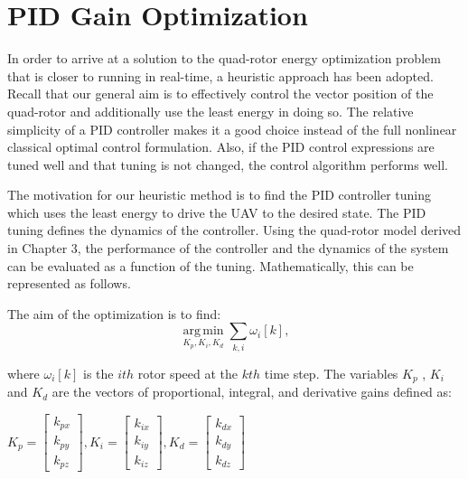 
\chapter{PID Gain Optimization} %

\label{Chapter7} %



In order to arrive at a solution to the quad-rotor energy optimization problem that is closer to running in real-time, a heuristic approach has been adopted. Recall that our general aim is to effectively control the vector position of the quad-rotor and additionally use the least energy in doing so. The relative simplicity of a PID controller makes it a good choice instead of the full nonlinear classical optimal control formulation. Also, if the PID control expressions are tuned well and that tuning is not changed, the control algorithm performs well.

The motivation for our heuristic method is to find the PID controller tuning which uses the least energy to drive the UAV to the desired state. The PID tuning defines the dynamics of the controller. Using the quad-rotor model derived in Chapter 3, the performance of the controller and the dynamics of the system can be evaluated as a function of the tuning. Mathematically, this can be represented as follows.

The aim of the optimization is to find:
\begin{equation}
  \operatorname*{arg\,min}_{K_p , K_i , K_d}          \sum_{k,i} \omega_i[k]    ,
\end{equation}

where $\omega_i[k]$ is the $ith$ rotor speed at the $kth$ time step. The variables $K_p$ , $K_i$ and $K_d$ are the vectors of proportional, integral, and derivative gains defined as:

\begin{center}
$ K_p = \left[ \begin{array}{c} k_{px} \\ k_{py} \\ k_{pz}  \end{array} \right] , K_i = \left[ \begin{array}{c} k_{ix} \\ k_{iy} \\ k_{iz}  \end{array} \right], K_d = \left[ \begin{array}{c} k_{dx} \\ k_{dy} \\ k_{dz}  \end{array} \right] $
\end{center}

